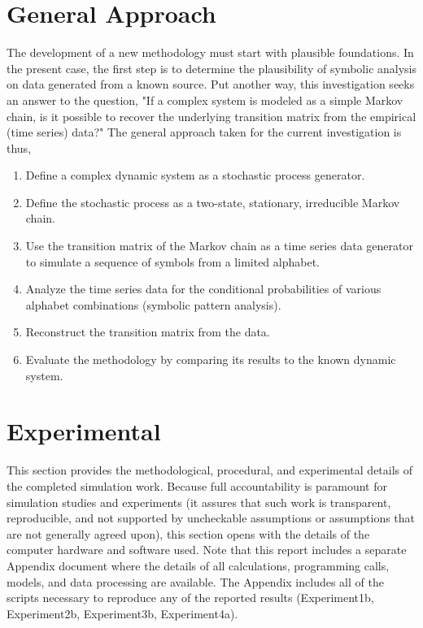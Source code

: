\documentclass[letter,11pt]{article}
\begin{document}
\section{General Approach}
The development of a new methodology must start with plausible foundations. In the present case, the first step is to determine the plausibility of symbolic analysis on data generated from a known source. Put another way, this investigation seeks an answer to the question, "If a complex system is modeled as a simple Markov chain, is it possible to recover the underlying transition matrix from the empirical (time series) data?" The general approach taken for the current investigation is thus,
\begin{center}
         \begin{enumerate}
           \item Define a complex dynamic system as a stochastic process generator.\\
           \item Define the stochastic process as a two-state, stationary, irreducible Markov chain.\\ 
           \item Use the transition matrix of the Markov chain as a time series data generator to simulate a sequence of symbols from a limited alphabet.\\
           \item Analyze the time series data for the conditional probabilities of various alphabet combinations (symbolic pattern analysis).\\
           \item Reconstruct the transition matrix from the data.\\
           \item Evaluate the methodology by comparing its results to the known dynamic system.
         \end{enumerate}
\end{center}

\section{Experimental}
This section provides the methodological, procedural, and experimental details of the completed simulation work. Because full accountability is paramount for simulation studies and experiments (it assures that such work is transparent, reproducible, and not supported by uncheckable assumptions or assumptions that are not generally agreed upon), this section opens with the details of the computer hardware and software used. Note that this report includes a separate Appendix document where the details of all calculations, programming calls, models, and data processing are available. The Appendix includes all of the scripts necessary to reproduce any of the reported results (Experiment1b, Experiment2b, Experiment3b, Experiment4a). 
\end{document}
